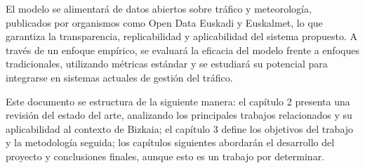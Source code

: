 El modelo se alimentará de datos abiertos sobre tráfico y meteorología, publicados por organismos como Open Data Euskadi y Euskalmet, lo que garantiza la transparencia, replicabilidad y aplicabilidad del sistema propuesto. A través de un enfoque empírico, se evaluará la eficacia del modelo frente a enfoques tradicionales, utilizando métricas estándar y se estudiará su potencial para integrarse en sistemas actuales de gestión del tráfico.

Este documento se estructura de la siguiente manera: el capítulo 2 presenta una revisión del estado del arte, analizando los principales trabajos relacionados y su aplicabilidad al contexto de Bizkaia; el capítulo 3 define los objetivos del trabajo y la metodología seguida; los capítulos siguientes abordarán el desarrollo del proyecto y conclusiones finales, aunque esto es un trabajo por determinar.
